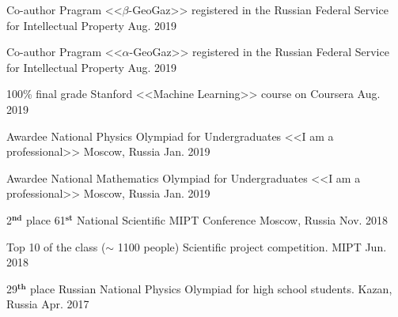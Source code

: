 
\begin{cvhonors}
    
  \cvhonor
    {Co-author} %
    {Pragram <<$\beta$-GeoGaz>> registered in the Russian Federal Service for Intellectual Property} %
    {} %
    {Aug. 2019} %
            
  \cvhonor
    {Co-author} %
    {Pragram <<$\alpha$-GeoGaz>> registered in the Russian Federal Service for Intellectual Property} %
    {} %
    {Aug. 2019} %
    
  \cvhonor
    {100\% final grade} %
    {Stanford <<Machine Learning>> course on Coursera} %
    {} %
    {Aug. 2019} %
    
  \cvhonor
    {Awardee} %
    {National Physics Olympiad for Undergraduates <<I am a professional>>} %
    {Moscow, Russia} %
    {Jan. 2019} %
    
    
  \cvhonor
    {Awardee} %
    {National Mathematics Olympiad for Undergraduates <<I am a professional>>} %
    {Moscow, Russia} %
    {Jan. 2019} %
    
  \cvhonor
    {2$^{\textbf{nd}}$ place} %
    {61$^{\textbf{st}}$ National Scientific MIPT Conference} %
    {Moscow, Russia} %
    {Nov. 2018} %
    
  \cvhonor
    {Top 10 of the class ($\sim$ 1100 people)} %
    {Scientific project competition.} %
    {MIPT} %
    {Jun. 2018} %

  \cvhonor
    {29$^{\textbf{th}}$ place} %
    {Russian National Physics Olympiad for high school students.} %
    {Kazan, Russia} %
    {Apr. 2017} %
	
\end{cvhonors}
